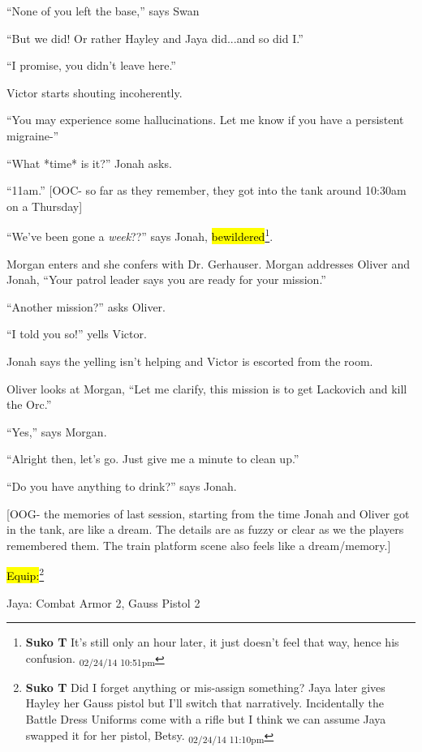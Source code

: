 ``None of you left the base,'' says Swan

``But we did!  Or rather Hayley and Jaya did...and so did I.''

``I promise, you didn't leave here.''

Victor starts shouting incoherently.

``You may experience some hallucinations.  Let me know if you have a persistent migraine-''

``What *time* is it?'' Jonah asks.

``11am.''  {[}OOC- so far as they remember, they got into the tank around 10:30am on a Thursday{]}

``We've been gone a \textit{week}??'' says Jonah, \hl{bewildered}\footnote{\textbf{Suko T }It's still only an hour later, it just doesn't feel that way, hence his confusion. \textsubscript{02/24/14 10:51pm}}.



Morgan enters and she confers with Dr. Gerhauser.  Morgan addresses Oliver and Jonah, ``Your patrol leader says you are ready for your mission.''

``Another mission?'' asks Oliver.

``I told you so!'' yells Victor.

Jonah says the yelling isn't helping and Victor is escorted from the room.

Oliver looks at Morgan, ``Let me clarify, this mission is to get Lackovich and kill the Orc.''

``Yes,'' says Morgan.

``Alright then, let's go.  Just give me a minute to clean up.''

``Do you have anything to drink?'' says Jonah.



{[}OOG- the memories of last session, starting from the time Jonah and Oliver got in the tank, are like a dream.  The details are as fuzzy or clear as we the players remembered them.  The train platform scene also feels like a dream/memory.{]}



\hl{Equip:}\footnote{\textbf{Suko T }Did I forget anything or mis-assign something?  Jaya later gives Hayley her Gauss pistol but I'll switch that narratively.  Incidentally the Battle Dress Uniforms come with a rifle but I think we can assume Jaya swapped it for her pistol, Betsy. \textsubscript{02/24/14 11:10pm}}

Jaya: Combat Armor 2, Gauss Pistol 2


